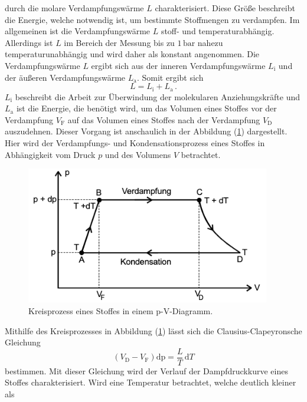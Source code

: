 durch die molare Verdampfungswärme $L$ charakterisiert. Diese Größe beschreibt die Energie, welche notwendig ist, um bestimmte Stoffmengen
zu verdampfen. Im allgemeinen ist die Verdampfungswärme $L$ stoff- und temperaturabhängig. Allerdings ist $L$ im Bereich der Messung bis zu $1\,\unit{\bar}$  
nahezu temperaturunabhängig und wird daher als konstant angenommen. Die Verdampfungswärme $L$ ergibt sich aus der inneren Verdampfungswärme $L_{\text{i}}$
und der äußeren Verdampfungswärme $L_{\text{a}}$. Somit ergibt sich 
\begin{equation}
    L = L_{\text{i}} + L_{\text{a}}\,.
    \label{eqn:Verdampfungswaerme}
\end{equation}
$L_{\text{i}}$ beschreibt die Arbeit zur Überwindung der molekularen Anziehungskräfte und $L_{\text{a}}$ ist die Energie, die benötigt wird, um das Volumen eines Stoffes vor der Verdampfung $V_{\text{F}}$
auf das Volumen eines Stoffes nach der Verdampfung $V_{\text{D}}$ auszudehnen.
Dieser Vorgang ist anschaulich in der Abbildung (\ref{fig:Kreisprozess}) dargestellt. Hier wird der Verdampfungs- und Kondensationsprozess eines Stoffes in Abhängigkeit vom Druck $p$ und des Volumens $V$
betrachtet.
\begin{figure}[H]
    \centering
    \includegraphics[width=0.95\textwidth]{Kreisprozess.png}
    \caption{Kreisprozess eines Stoffes in einem p-V-Diagramm. \cite{anleitungV203}}
    \label{fig:Kreisprozess}
\end{figure}
Mithilfe des Kreisprozesses in Abbildung (\ref{fig:Kreisprozess}) lässt sich die Clausius-Clapeyronsche Gleichung
\begin{equation}
    \left(V_{\text{D}} - V_{\text{F}}\right)\text{dp} = \frac{L}{T}\,\text{d}T
    \label{eqn:ClausiusClapeyronscheGleichung}
\end{equation}
bestimmen. Mit dieser Gleichung wird der Verlauf der Dampfdruckkurve eines Stoffes charakterisiert. Wird eine Temperatur betrachtet, welche deutlich kleiner als
